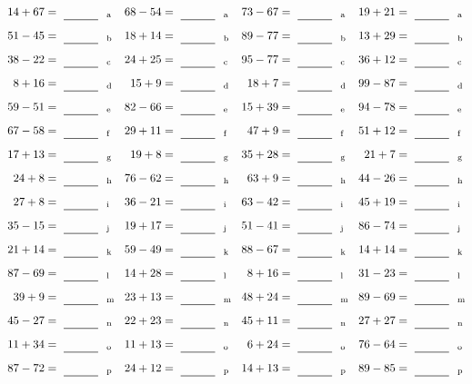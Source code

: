 \documentclass
[
  draft    = true,
  fontsize = 11pt,
  parskip  = half-
]
{scrartcl}
\begin{document}
\clearpage
\begin{align*}
    \pline{14+67}&=\rline{a}
  & \pline{68-54}&=\rline{a}
  & \pline{73-67}&=\rline{a}
  & \pline{19+21}&=\rline{a} \\[1ex]
    \pline{51-45}&=\rline{b}
  & \pline{18+14}&=\rline{b}
  & \pline{89-77}&=\rline{b}
  & \pline{13+29}&=\rline{b} \\[1ex]
    \pline{38-22}&=\rline{c}
  & \pline{24+25}&=\rline{c}
  & \pline{95-77}&=\rline{c}
  & \pline{36+12}&=\rline{c} \\[1ex]
    \pline{8+16}&=\rline{d}
  & \pline{15+9}&=\rline{d}
  & \pline{18+7}&=\rline{d}
  & \pline{99-87}&=\rline{d} \\[1ex]
    \pline{59-51}&=\rline{e}
  & \pline{82-66}&=\rline{e}
  & \pline{15+39}&=\rline{e}
  & \pline{94-78}&=\rline{e} \\[1ex]
    \pline{67-58}&=\rline{f}
  & \pline{29+11}&=\rline{f}
  & \pline{47+9}&=\rline{f}
  & \pline{51+12}&=\rline{f} \\[1ex]
    \pline{17+13}&=\rline{g}
  & \pline{19+8}&=\rline{g}
  & \pline{35+28}&=\rline{g}
  & \pline{21+7}&=\rline{g} \\[1ex]
    \pline{24+8}&=\rline{h}
  & \pline{76-62}&=\rline{h}
  & \pline{63+9}&=\rline{h}
  & \pline{44-26}&=\rline{h} \\[1ex]
    \pline{27+8}&=\rline{i}
  & \pline{36-21}&=\rline{i}
  & \pline{63-42}&=\rline{i}
  & \pline{45+19}&=\rline{i} \\[1ex]
    \pline{35-15}&=\rline{j}
  & \pline{19+17}&=\rline{j}
  & \pline{51-41}&=\rline{j}
  & \pline{86-74}&=\rline{j} \\[1ex]
    \pline{21+14}&=\rline{k}
  & \pline{59-49}&=\rline{k}
  & \pline{88-67}&=\rline{k}
  & \pline{14+14}&=\rline{k} \\[1ex]
    \pline{87-69}&=\rline{l}
  & \pline{14+28}&=\rline{l}
  & \pline{8+16}&=\rline{l}
  & \pline{31-23}&=\rline{l} \\[1ex]
    \pline{39+9}&=\rline{m}
  & \pline{23+13}&=\rline{m}
  & \pline{48+24}&=\rline{m}
  & \pline{89-69}&=\rline{m} \\[1ex]
    \pline{45-27}&=\rline{n}
  & \pline{22+23}&=\rline{n}
  & \pline{45+11}&=\rline{n}
  & \pline{27+27}&=\rline{n} \\[1ex]
    \pline{11+34}&=\rline{o}
  & \pline{11+13}&=\rline{o}
  & \pline{6+24}&=\rline{o}
  & \pline{76-64}&=\rline{o} \\[1ex]
    \pline{87-72}&=\rline{p}
  & \pline{24+12}&=\rline{p}
  & \pline{14+13}&=\rline{p}
  & \pline{89-85}&=\rline{p}
\end{align*}
\end{document}
